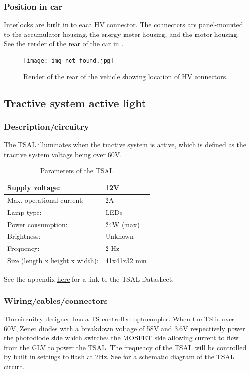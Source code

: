\documentclass{article}
\begin{document}
\subsubsection{Position in car}
Interlocks are built in to each HV connector. The connectors are panel-mounted to the accumulator housing, the energy meter housing, and the motor housing. See the render of the rear of the car in .

\begin{figure}[H]
\centering
\texttt{[image: img\_not\_found.jpg]}
\caption{Render of the rear of the vehicle showing location of HV connectors.}
\label{fig:rear_of_car}
\end{figure}

\subsection{Tractive system active light}\label{tractive_system_active_light}
\subsubsection{Description/circuitry}
The TSAL illuminates when the tractive system is active, which is defined as the tractive system voltage being over 60V.

	\begin{table}[H]
	    \centering
	    \begin{tabular}{|l|l|}
	    \hline
	    Supply voltage: & 12V \\ \hline
	    Max. operational current: &  2A\\ \hline
	    Lamp type: & LEDs \\ \hline
	    Power consumption: & 24W (max)\\ \hline
	    Brightness: & Unknown\\ \hline
	    Frequency: & 2 Hz \\ \hline
	    Size (length x height x width): & 41x41x32 mm \\ \hline
	    \end{tabular}
	    \caption{Parameters of the TSAL}
	    \label{TSALparameters}
	\end{table}
	
See the appendix \hyperlink{TSALdatasheet}{here} for a link to the TSAL Datasheet.

\subsubsection{Wiring/cables/connectors}
The circuitry designed has a TS-controlled optocoupler. When the TS is over 60V, Zener diodes with a breakdown voltage of 58V and 3.6V respectively power the photodiode side which switches the MOSFET side allowing current to flow from the GLV to power the TSAL. The frequency of the TSAL will be controlled by built in settings to flash at 2Hz. See  for a schematic diagram of the TSAL circuit.
\end{document}
